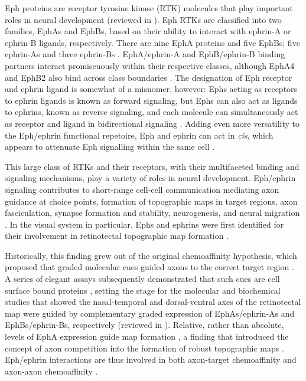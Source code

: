 Eph proteins are receptor tyrosine kinase (RTK) molecules that play important roles in neural development (reviewed in ).
Eph RTKs are classified into two families, EphAs and EphBs, based on their ability to interact with ephrin-A or ephrin-B ligands, respectively.
There are nine EphA proteins and five EphBs; five ephrin-As and three ephrin-Bs \cite{lisabeth2013eph,kania2016mechanisms}.
EphA/ephrin-A and EphB/ephrin-B binding partners interact promiscuously within their respective classes, although EphA4 and EphB2 also bind across class boundaries \cite{lisabeth2013eph,kania2016mechanisms}.
The designation of Eph receptor and ephrin ligand is somewhat of a misnomer, however: Ephs acting as receptors to ephrin ligands is known as forward signaling, but Ephs can also act as ligands to ephrins, known as reverse signaling, and each molecule can simultaneously act as receptor and ligand in bidirectional signaling \cite{egea2007bidirectional,kania2016mechanisms}.
Adding even more versatility to the Eph/ephrin functional repetoire, Eph and ephrin can act in \emph{cis}, which appears to attenuate Eph signalling within the same cell \cite{marquardt2005coexpressed,carvalho2006silencing,kao2011ephrin}.

This large class of RTKs and their receptors, with their multifaceted binding and signaling mechanisms, play a variety of roles in neural development.
Eph/ephrin signaling contributes to short-range cell-cell communication mediating axon guidance at choice points, formation of topographic maps in target regions, axon fasciculation, synapse formation and stability, neurogenesis, and neural migration \cite{kania2016mechanisms}.
In the visual system in particular, Ephs and ephrins were first identified for their involvement in retinotectal topographic map formation \cite{cheng1995complementary,drescher1995vitro}.

Historically, this finding grew out of the original chemoaffinity hypothesis, which proposed that graded molecular cues guided axons to the correct target region \cite{attardi1963preferential,sperry1963chemoaffinity}.
A series of elegant \invitro{} assays subsequently demonstrated that such cues are cell surface bound proteins \cite{walter1987recognition,walter1987avoidance,walter1990axonal}, setting the stage for the molecular and biochemical studies that showed the nasal-temporal and dorsal-ventral axes of the retinotectal map were guided by complementary graded expression of EphAs/ephrin-As and EphBs/ephrin-Bs, respectively (reviewed in ).
Relative, rather than absolute, levels of EphA expression guide map formation \cite{brown2000topographic}, a finding that introduced the concept of axon competition into the formation of robust topographic maps \cite{feldheim2010visual,triplett2012eph}.
Eph/ephrin interactions are thus involved in both axon-target chemoaffinity and axon-axon chemoaffinity \cite{weth2014chemoaffinity}.